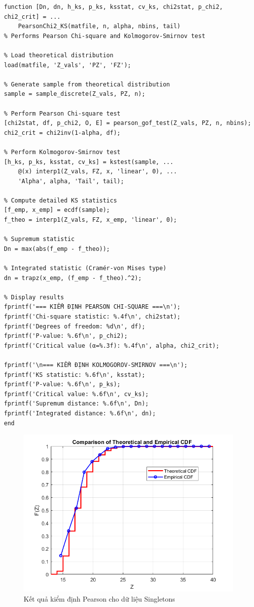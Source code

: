 \begin{matlab}
\begin{lstlisting}
function [Dn, dn, h_ks, p_ks, ksstat, cv_ks, chi2stat, p_chi2, chi2_crit] = ...
    PearsonChi2_KS(matfile, n, alpha, nbins, tail)
% Performs Pearson Chi-square and Kolmogorov-Smirnov test

% Load theoretical distribution
load(matfile, 'Z_vals', 'PZ', 'FZ');

% Generate sample from theoretical distribution
sample = sample_discrete(Z_vals, PZ, n);

% Perform Pearson Chi-square test
[chi2stat, df, p_chi2, O, E] = pearson_gof_test(Z_vals, PZ, n, nbins);
chi2_crit = chi2inv(1-alpha, df);

% Perform Kolmogorov-Smirnov test
[h_ks, p_ks, ksstat, cv_ks] = kstest(sample, ...
    @(x) interp1(Z_vals, FZ, x, 'linear', 0), ...
    'Alpha', alpha, 'Tail', tail);

% Compute detailed KS statistics
[f_emp, x_emp] = ecdf(sample);
f_theo = interp1(Z_vals, FZ, x_emp, 'linear', 0);

% Supremum statistic
Dn = max(abs(f_emp - f_theo));

% Integrated statistic (Cramér-von Mises type)
dn = trapz(x_emp, (f_emp - f_theo).^2);

% Display results
fprintf('=== KIỂM ĐỊNH PEARSON CHI-SQUARE ===\n');
fprintf('Chi-square statistic: %.4f\n', chi2stat);
fprintf('Degrees of freedom: %d\n', df);
fprintf('P-value: %.6f\n', p_chi2);
fprintf('Critical value (α=%.3f): %.4f\n', alpha, chi2_crit);

fprintf('\n=== KIỂM ĐỊNH KOLMOGOROV-SMIRNOV ===\n');
fprintf('KS statistic: %.6f\n', ksstat);
fprintf('P-value: %.6f\n', p_ks);
fprintf('Critical value: %.6f\n', cv_ks);
fprintf('Supremum distance: %.6f\n', Dn);
fprintf('Integrated distance: %.6f\n', dn);
end
\end{lstlisting}
\end{matlab}

\begin{figure}[h!]
    \centering
    \includegraphics[width=0.8\linewidth]{../../assets/images/Singletons_Pearson.png}
    \caption{Kết quả kiểm định Pearson cho dữ liệu Singletons}
\end{figure}

